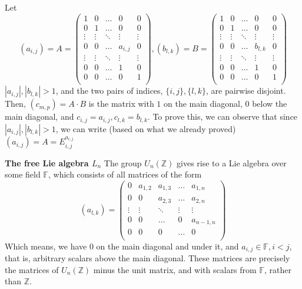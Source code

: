 \documentclass[12pt]{article}
\begin{document}
Let
$$
(a_{i,j})=A=\begin{pmatrix} 
	1 & 0 & \dots & 0 & 0 \\
	0 & 1 & \dots & 0 & 0 \\
	\vdots & \vdots & \ddots & \vdots & \vdots \\
	0 & 0 & \dots & a_{i,j} & 0 \\
	\vdots & \vdots & \ddots & \vdots & \vdots \\
	0 & 0 & \dots & 1 & 0 \\
	0 & 0 & \dots & 0 & 1 \\
\end{pmatrix},
(b_{l,k})=B=\begin{pmatrix} 
	1 & 0 & \dots & 0 & 0 \\
	0 & 1 & \dots & 0 & 0 \\
	\vdots & \vdots & \ddots & \vdots & \vdots \\
	0 & 0 & \dots & b_{l,k} & 0 \\
	\vdots & \vdots & \ddots & \vdots & \vdots \\
	0 & 0 & \dots & 1 & 0 \\
	0 & 0 & \dots & 0 & 1 \\
\end{pmatrix}
$$
\( |a_{i,j}|,|b_{l,k}|>1 \), and the two pairs of indices, \( \{i,j\},\{l,k\} \), are pairwise disjoint. \newline
Then, \( (c_{m,p})=A \cdot B \) is the matrix with \( 1 \) on the main diagonal, \( 0 \) below the main diagonal,\newline
and \( c_{i,j}=a_{i,j},c_{l,k}=b_{l,k} \). \newline
To prove this, we can observe that since \( |a_{i,j}|,|b_{l,k}|>1 \), we can write (based on what we already proved) \newline
\( (a_{i,j})=A=E_{i,j}^{a_{i,j}} \) \newpage

\textbf{The free Lie algebra \( L_{n}\)} \newline
The group \( U_{n}(\mathbb{Z}) \) gives rise to a Lie algebra over some field \( \mathbb{F} \), \newline
which consists of all matrices of the form $$ (a_{l,k})=\begin{pmatrix} 
	0 & a_{1,2} & a_{1,3} & \dots & a_{1,n} \\
	0 & 0 & a_{2,3} & \dots & a_{2,n} \\
	\vdots & \vdots & \ddots & \vdots & \vdots \\
	0 & 0 & \dots & 0 & a_{n-1,n} \\
	0 & 0 & 0 & \dots & 0 \\
\end{pmatrix} 
$$
Which means, we have \( 0 \) on the main diagonal and under it, and \( a_{i,j} \in \mathbb{F},i<j \), \newline
that is, arbitrary scalars above the main diagonal. These matrices are precisely the matrices of \( U_{n}(\mathbb{Z}) \) \newline
minus the unit matrix, and with scalars from \( \mathbb{F} \), rather than \( \mathbb{Z} \). \newline
\end{document}
